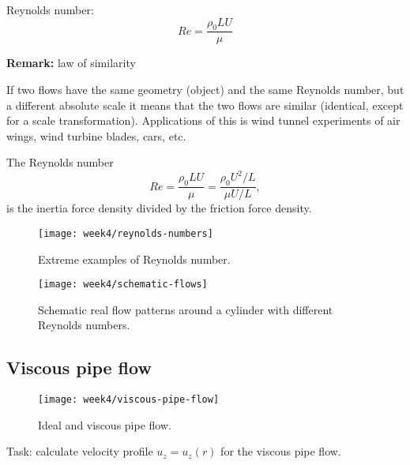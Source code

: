 Reynolds number:
\begin{equation}
Re = \frac{\rho_0 L U}{\mu}
\end{equation}

\begin{framed}
\textbf{Remark:} law of similarity

If two flows have the same geometry (object) and the same Reynolds number, but a different absolute scale it means that the two flows are similar (identical, except for a scale transformation). Applications of this is wind tunnel experiments of air wings, wind turbine blades, cars, etc.
\end{framed}

The Reynolds number
\begin{equation}
Re = \frac{\rho_0 L U}{\mu} = \frac{\rho_0 U^2/L}{\mu U/L},
\end{equation}
is the inertia force density divided by the friction force density.

\begin{figure}[p]
    \centering
    \texttt{[image: week4/reynolds-numbers]}\\
    \caption{Extreme examples of Reynolds number.}
    \label{fig:reynolds-numbers}
\end{figure}

\begin{figure}[p]
    \centering
    \texttt{[image: week4/schematic-flows]}\\
    \caption{Schematic real flow patterns around a cylinder with different Reynolds numbers.}
    \label{fig:schematic-flows}
\end{figure}


\newpage
\subsection{Viscous pipe flow}

\begin{figure}[ht]
    \centering
    \texttt{[image: week4/viscous-pipe-flow]}\\
    \caption{Ideal and viscous pipe flow.}
    \label{fig:viscous-pipe-flow}
\end{figure}

Task: calculate velocity profile $u_z=u_z(r)$ for the viscous pipe flow.

